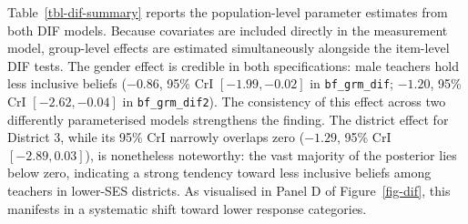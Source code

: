 \documentclass[
  man,
  floatsintext,
  longtable,
  nolmodern,
  notxfonts,
  notimes,
  colorlinks=true,linkcolor=blue,citecolor=blue,urlcolor=blue]{apa7}
\begin{document}
Table~\ref{tbl-dif-summary} reports the population-level parameter
estimates from both DIF models. Because covariates are included directly
in the measurement model, group-level effects are estimated
simultaneously alongside the item-level DIF tests. The gender effect is
credible in both specifications: male teachers hold less inclusive
beliefs (\(-0.86\), 95\% CrI \([-1.99, -0.02]\) in
\texttt{bf\_grm\_dif}; \(-1.20\), 95\% CrI \([-2.62, -0.04]\) in
\texttt{bf\_grm\_dif2}). The consistency of this effect across two
differently parameterised models strengthens the finding. The district
effect for District 3, while its 95\% CrI narrowly overlaps zero
(\(-1.29\), 95\% CrI \([-2.89, 0.03]\)), is nonetheless noteworthy: the
vast majority of the posterior lies below zero, indicating a strong
tendency toward less inclusive beliefs among teachers in lower-SES
districts. As visualised in Panel D of Figure~\ref{fig-dif}, this
manifests in a systematic shift toward lower response categories.

\fontsize{10.5pt}{12.6pt}\selectfont
\end{document}
